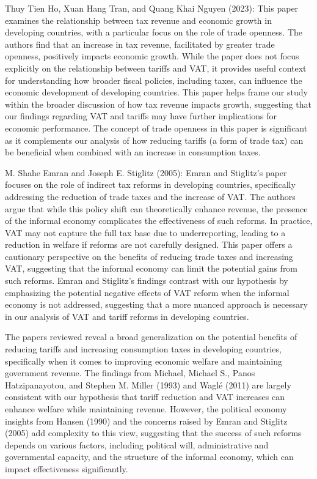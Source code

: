 \documentclass[12pt]{article}
\begin{document}
Thuy Tien Ho, Xuan Hang Tran, and Quang Khai Nguyen (2023):
This paper examines the relationship between tax revenue and economic growth in developing countries, with a particular focus on the role of trade openness. The authors find that an increase in tax revenue, facilitated by greater trade openness, positively impacts economic growth. While the paper does not focus explicitly on the relationship between tariffs and VAT, it provides useful context for understanding how broader fiscal policies, including taxes, can influence the economic development of developing countries. This paper helps frame our study within the broader discussion of how tax revenue impacts growth, suggesting that our findings regarding VAT and tariffs may have further implications for economic performance. The concept of trade openness in this paper is significant as it complements our analysis of how reducing tariffs (a form of trade tax) can be beneficial when combined with an increase in consumption taxes.

M. Shahe Emran and Joseph E. Stiglitz (2005):
Emran and Stiglitz’s paper focuses on the role of indirect tax reforms in developing countries, specifically addressing the reduction of trade taxes and the increase of VAT. The authors argue that while this policy shift can theoretically enhance revenue, the presence of the informal economy complicates the effectiveness of such reforms. In practice, VAT may not capture the full tax base due to underreporting, leading to a reduction in welfare if reforms are not carefully designed. This paper offers a cautionary perspective on the benefits of reducing trade taxes and increasing VAT, suggesting that the informal economy can limit the potential gains from such reforms. Emran and Stiglitz's findings contrast with our hypothesis by emphasizing the potential negative effects of VAT reform when the informal economy is not addressed, suggesting that a more nuanced approach is necessary in our analysis of VAT and tariff reforms in developing countries.

The papers reviewed reveal a broad generalization on the potential benefits of reducing tariffs and increasing consumption taxes in developing countries, specifically when it comes to improving economic welfare and maintaining government revenue. The findings from Michael, Michael S., Panos Hatzipanayotou, and Stephen M. Miller (1993) and Waglé (2011) are largely consistent with our hypothesis that tariff reduction and VAT increases can enhance welfare while maintaining revenue. However, the political economy insights from Hansen (1990) and the concerns raised by Emran and Stiglitz (2005) add complexity to this view, suggesting that the success of such reforms depends on various factors, including political will, administrative and governmental capacity, and the structure of the informal economy, which can impact effectiveness significantly.
\end{document}
